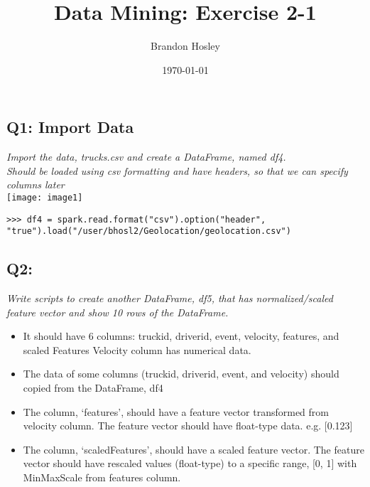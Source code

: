 \documentclass[]{article}
\title{Data Mining: Exercise 2-1}
\author{Brandon Hosley}
\date{\today}
\begin{document}
\maketitle

\vspace{3em}

\subsection*{Q1: Import Data}
\emph{Import the data, trucks.csv and create a DataFrame, named df4. \\
	Should be loaded using csv formatting and have headers, so that we can specify columns later} \\
	\texttt{[image: image1]}
\begin{verbatim}
>>> df4 = spark.read.format("csv").option("header", "true").load("/user/bhosl2/Geolocation/geolocation.csv")
\end{verbatim}

\clearpage
\subsection*{Q2: }
\emph{Write scripts to create another DataFrame, df5, 
	that has normalized/scaled feature vector and
	show 10 rows of the DataFrame.}
	\begin{itemize}[before=\itshape,font=\normalfont]
		\item It should have 6 columns: truckid, driverid, event, velocity, features, and scaled Features Velocity column has numerical data.
		\item The data of some columns (truckid, driverid, event, and velocity) should copied from the DataFrame, df4
		\item The column, ‘features’, should have a feature vector transformed from velocity column. The feature vector should have float-type data. e.g. [0.123]
		\item The column, ‘scaledFeatures’, should have a scaled feature vector. The feature vector should have rescaled values (float-type) to a specific range, [0, 1] with MinMaxScale from features column.
	\end{itemize} 

\begin{verbatim}

\end{verbatim}
\end{document}
